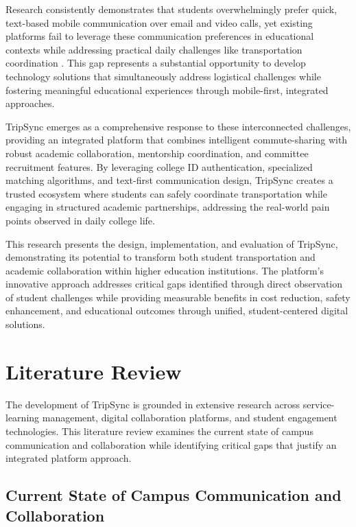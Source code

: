 \documentclass[conference]{IEEEtran}
\begin{document}
Research consistently demonstrates that students overwhelmingly prefer quick, text-based mobile communication over email and video calls, yet existing platforms fail to leverage these communication preferences in educational contexts while addressing practical daily challenges like transportation coordination \cite{ref13}\cite{ref14}. This gap represents a substantial opportunity to develop technology solutions that simultaneously address logistical challenges while fostering meaningful educational experiences through mobile-first, integrated approaches.

TripSync emerges as a comprehensive response to these interconnected challenges, providing an integrated platform that combines intelligent commute-sharing with robust academic collaboration, mentorship coordination, and committee recruitment features. By leveraging college ID authentication, specialized matching algorithms, and text-first communication design, TripSync creates a trusted ecosystem where students can safely coordinate transportation while engaging in structured academic partnerships, addressing the real-world pain points observed in daily college life.

This research presents the design, implementation, and evaluation of TripSync, demonstrating its potential to transform both student transportation and academic collaboration within higher education institutions. The platform's innovative approach addresses critical gaps identified through direct observation of student challenges while providing measurable benefits in cost reduction, safety enhancement, and educational outcomes through unified, student-centered digital solutions.

\section{Literature Review}

The development of TripSync is grounded in extensive research across service-learning management, digital collaboration platforms, and student engagement technologies. This literature review examines the current state of campus communication and collaboration while identifying critical gaps that justify an integrated platform approach.

\subsection{Current State of Campus Communication and Collaboration}
\end{document}

